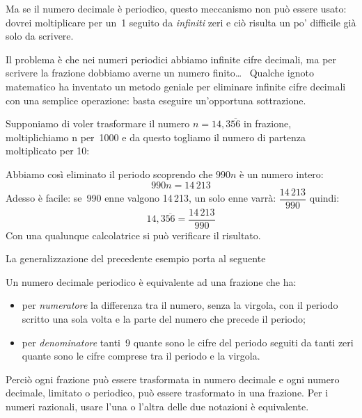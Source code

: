 Ma se il numero decimale è periodico, questo meccanismo non può essere 
usato: dovrei moltiplicare per un~1 seguito da \emph{infiniti} zeri e ciò 
risulta un po' difficile già solo da scrivere.

Il problema è che nei numeri periodici abbiamo infinite cifre decimali, ma 
per scrivere la frazione dobbiamo averne un numero finito\dots~ 
Qualche ignoto matematico ha inventato un metodo geniale per eliminare 
infinite cifre decimali con una semplice operazione: basta eseguire 
un'opportuna sottrazione.

Supponiamo di voler trasformare il numero \(n = 14,3\overline{56}\) in 
frazione, moltiplichiamo n per~1000 e da questo togliamo il numero di 
partenza moltiplicato per 10:

{\sottrazioneraz}

Abbiamo così eliminato il periodo scoprendo che \(990n\) è un numero 
intero:
\[990n = 14\,213\]
Adesso è facile: se~990 enne valgono 14\,213, un solo enne varrà:
\(\dfrac{14\,213}{990}\)
quindi:
\[14,3\overline{56} = \frac{14\,213}{990}\]
Con una qualunque calcolatrice si può verificare il risultato.

\medskip
La generalizzazione del precedente esempio porta al 
seguente

\begin{teorema}{}{}
 Un numero decimale periodico è equivalente ad 
una frazione che ha:
\begin{itemize}
\item per \emph{numeratore} la differenza tra il numero, senza la virgola, 
con il periodo scritto una sola volta e la parte del numero che precede 
il periodo;
\item per \emph{denominatore} tanti~9 quante sono le cifre del periodo 
seguiti da tanti zeri quante sono le cifre comprese tra il periodo e la 
virgola.
\end{itemize}
\end{teorema}

Perciò ogni frazione può essere trasformata in 
numero decimale e ogni numero decimale, limitato o periodico, può essere 
trasformato in una frazione. 
Per i numeri razionali, usare l'una o l'altra delle due 
notazioni è equivalente.

